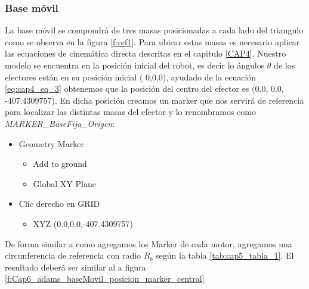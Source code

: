         \subsubsection{Base móvil}
    
        La base móvil se compondrá de tres masas posicionadas a cada lado del triangulo como se observa en la figura \eqref{f:ref1}. Para ubicar estas masas es necesario aplicar las ecuaciones de cinemática directa descritas en el capitulo \eqref{CAP4}. Nuestro modelo se encuentra en la posición inicial del robot, es decir lo ángulos $\theta$ de los efectores están en su posición inicial ( 0,0,0), ayudado de la ecuación \eqref{eq:cap4_eq_3} obtenemos que la posición del centro del efector es (0.0, 0.0, -407.4309757). En dicha posición creamos un marker que nos servirá de referencia para localizar las distintas masas del efector y lo renombramos como \textit{MARKER\_BaseFija\_Origen}:
        
        \begin{scope}
            \renewcommand{\labelitemi}{\blacklozenge}
            \renewcommand{\labelitemii}{\checkmark}
            \begin{itemize}
                \item Geometry Marker
                \begin{itemize}
                    \item Add to ground 
                    \item Global XY Plane
                \end{itemize}
                \item Clic derecho en GRID
                \begin{itemize}
                    \item XYZ (0.0,0.0,-407.4309757)
                \end{itemize}
            \end{itemize}
        \end{scope}

        De forma similar a como agregamos los Marker de cada motor, agregamos una circunferencia de referencia con radio $R_{b}$ según la tabla \eqref{tab:cap5_tabla_1}. El resultado deberá ser similar al a figura \eqref{f:Cap6_adams_baseMovil_posicion_marker_central}
   
